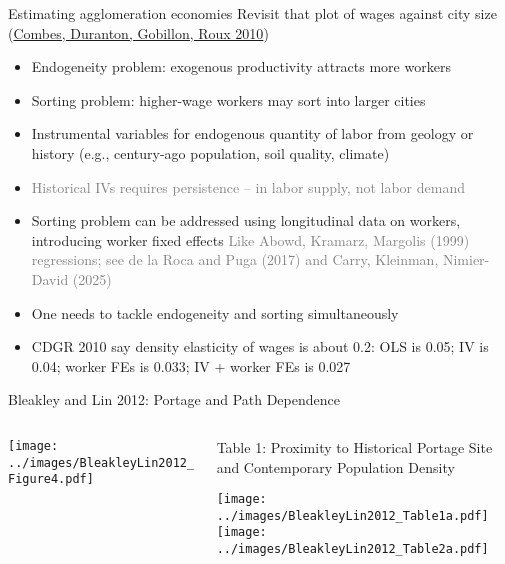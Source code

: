 \documentclass[11pt,notes=hide,aspectratio=169]{beamer}
\begin{document}
\begin{frame}{Estimating agglomeration economies}
Revisit that plot of wages against city size
{\footnotesize (\href{https://www.nber.org/system/files/chapters/c7978/c7978.pdf}{Combes, Duranton, Gobillon, Roux 2010})}
\begin{itemize}
\item Endogeneity problem: exogenous productivity attracts more workers
\item Sorting problem: higher-wage workers may sort into larger cities
\item Instrumental variables for endogenous quantity of labor from geology or history
(e.g., century-ago population, soil quality, climate)
\item[] {\small \textcolor{gray}{Historical IVs requires persistence -- in labor supply, not labor demand}}
\item Sorting problem can be addressed using longitudinal data on workers, introducing worker fixed effects
{\small \textcolor{gray}{Like Abowd, Kramarz, Margolis (1999) regressions; see {de la Roca and Puga (2017)} and {Carry, Kleinman, Nimier-David (2025)}}}
\item One needs to tackle endogeneity and sorting simultaneously
\item CDGR 2010 say density elasticity of wages is about 0.2:
OLS is 0.05; IV is 0.04; worker FEs is 0.033; IV + worker FEs is 0.027
\end{itemize}
\end{frame}
\begin{frame}{Bleakley and Lin 2012: Portage and Path Dependence}
\begin{columns}
\begin{column}{.45\textwidth}
\texttt{[image: ../images/BleakleyLin2012\_Figure4.pdf]}
\end{column}
\begin{column}{.40\textwidth}
{\tiny Table 1: Proximity to Historical Portage Site and Contemporary Population Density\par}
\texttt{[image: ../images/BleakleyLin2012\_Table1a.pdf]} \\
\texttt{[image: ../images/BleakleyLin2012\_Table2a.pdf]}
\end{column}
\end{columns}
\end{frame}
\end{document}
